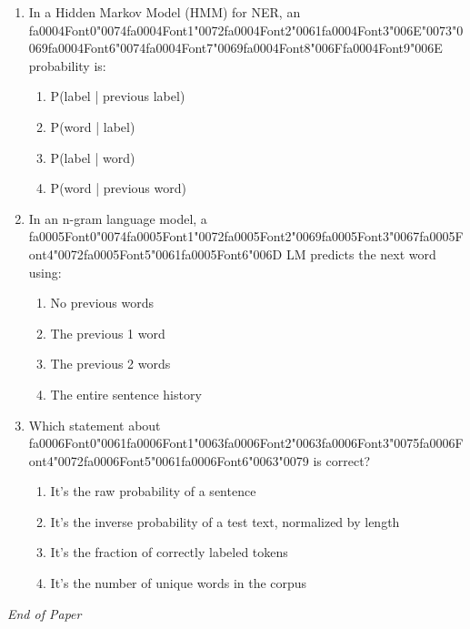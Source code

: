 \documentclass[12pt]{article}
\begin{document}
\begin{enumerate}[label=Q\arabic*.]
\begin{enumerate}[label=(\Alph*)]
    \item It models emissions P(word | label)
    \item It is identical to an HMM
\end{enumerate}
\item In a Hidden Markov Model (HMM) for NER, an {\csname fa0004Font0\endcsname\char"0074}{\csname fa0004Font1\endcsname\char"0072}{\csname fa0004Font2\endcsname\char"0061}{\csname fa0004Font3\endcsname\char"006E}{\char"0073}{\char"0069}{\csname fa0004Font6\endcsname\char"0074}{\csname fa0004Font7\endcsname\char"0069}{\csname fa0004Font8\endcsname\char"006F}{\csname fa0004Font9\endcsname\char"006E} probability is:
\begin{enumerate}[label=(\Alph*)]
    \item P(label | previous label)
    \item P(word | label)
    \item P(label | word)
    \item P(word | previous word)
\end{enumerate}
\item In an n-gram language model, a {\csname fa0005Font0\endcsname\char"0074}{\csname fa0005Font1\endcsname\char"0072}{\csname fa0005Font2\endcsname\char"0069}{\csname fa0005Font3\endcsname\char"0067}{\csname fa0005Font4\endcsname\char"0072}{\csname fa0005Font5\endcsname\char"0061}{\csname fa0005Font6\endcsname\char"006D} LM predicts the next word using:
\begin{enumerate}[label=(\Alph*)]
    \item No previous words
    \item The previous 1 word
    \item The previous 2 words
    \item The entire sentence history
\end{enumerate}
\item Which statement about {\csname fa0006Font0\endcsname\char"0061}{\csname fa0006Font1\endcsname\char"0063}{\csname fa0006Font2\endcsname\char"0063}{\csname fa0006Font3\endcsname\char"0075}{\csname fa0006Font4\endcsname\char"0072}{\csname fa0006Font5\endcsname\char"0061}{\csname fa0006Font6\endcsname\char"0063}{\char"0079} is correct?
\begin{enumerate}[label=(\Alph*)]
    \item It's the raw probability of a sentence
    \item It's the inverse probability of a test text, normalized by length
    \item It's the fraction of correctly labeled tokens
    \item It's the number of unique words in the corpus
\end{enumerate}
\end{enumerate}

\vfill
\noindent\textit{End of Paper}
\end{document}
